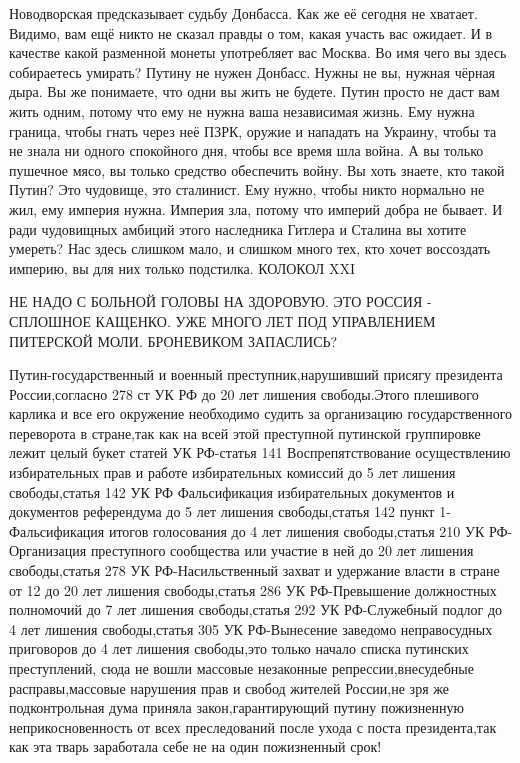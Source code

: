 Новодворская предсказывает судьбу Донбасса. Как же её сегодня не хватает.
Видимо, вам ещё никто не сказал правды о том, какая участь вас ожидает. И в качестве какой разменной монеты употребляет вас Москва. Во имя чего вы здесь собираетесь умирать? Путину не нужен Донбасс. Нужны не вы, нужная чёрная дыра. Вы же понимаете, что одни вы жить не будете. Путин просто не даст вам жить одним, потому что ему не нужна ваша независимая жизнь. Ему нужна граница, чтобы гнать через неё ПЗРК, оружие и нападать на Украину, чтобы та не знала ни одного спокойного дня, чтобы все время шла война. А вы только пушечное мясо, вы только средство обеспечить войну. Вы хоть знаете, кто такой Путин? Это чудовище, это сталинист. Ему нужно, чтобы никто нормально не жил, ему империя нужна. Империя зла, потому что империй добра не бывает. И ради чудовищных амбиций этого наследника Гитлера и Сталина вы хотите умереть? Нас здесь слишком мало, и слишком много тех, кто хочет воссоздать империю, вы для них только подстилка.
КОЛОКОЛ XXI

НЕ НАДО С БОЛЬНОЙ ГОЛОВЫ НА ЗДОРОВУЮ. ЭТО РОССИЯ - СПЛОШНОЕ КАЩЕНКО. УЖЕ МНОГО
ЛЕТ ПОД УПРАВЛЕНИЕМ ПИТЕРСКОЙ МОЛИ. БРОНЕВИКОМ ЗАПАСЛИСЬ?

Путин-государственный и военный преступник,нарушивший присягу президента
России,согласно 278 ст УК РФ до 20 лет лишения свободы.Этого плешивого карлика
и все его окружение необходимо судить за организацию государственного
переворота в стране,так как на всей этой преступной путинской группировке лежит
целый букет статей УК РФ-статья 141 Воспрепятствование осуществлению
избирательных прав и работе избирательных комиссий до 5 лет лишения
свободы,статья 142 УК РФ Фальсификация избирательных документов и документов
референдума до 5 лет лишения свободы,статья 142 пункт 1-Фальсификация итогов
голосования до 4 лет лишения свободы,статья 210 УК РФ-Организация преступного
сообщества или участие в ней до 20 лет лишения свободы,статья 278 УК
РФ-Насильственный захват и удержание власти в стране от 12 до 20 лет лишения
свободы,статья 286 УК РФ-Превышение должностных полномочий до 7 лет лишения
свободы,статья 292 УК РФ-Служебный подлог до 4 лет лишения свободы,статья 305
УК РФ-Вынесение заведомо неправосудных приговоров до 4 лет лишения свободы,это
только начало списка путинских преступлений, сюда не вошли массовые незаконные
репрессии,внесудебные расправы,массовые нарушения прав и свобод жителей
России,не зря же подконтрольная дума приняла закон,гарантирующий путину
пожизненную неприкосновенность от всех преследований после ухода с поста
президента,так как эта тварь заработала себе не на один пожизненный срок!

